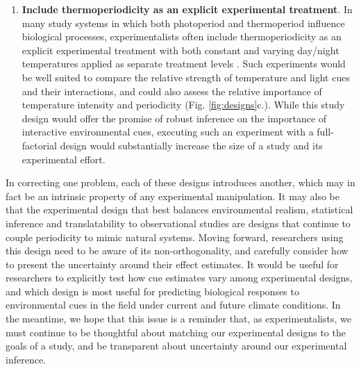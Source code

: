 \documentclass[11pt]{article}
\begin{document}
\begin{enumerate}
\item \textbf{Include thermoperiodicity as an explicit experimental treatment}. In many study systems in which both photoperiod and thermoperiod influence biological processes, experimentalists often include thermoperiodicity as an explicit experimental treatment with both constant and varying day/night temperatures applied as separate treatment levels \citep[e.g.,][]{Zaslavksi_1995}. Such experiments would be well suited to compare the relative strength of temperature and light cues and their interactions, and could also assess the relative importance of temperature intensity and periodicity (Fig. \ref{fig:designs}c.). While this study design would offer the promise of robust inference on the importance of interactive environmental cues, executing such an experiment with a full-factorial design would substantially increase the size of a study and its experimental effort. 
\end{enumerate}

In correcting one problem, each of these designs introduces another, which may in fact be an intrinsic property of any experimental manipulation. It may also be that the experimental design that best balances environmental realism, statistical inference and translatability to observational studies are designs that continue to couple periodicity to mimic natural systems. Moving forward, researchers using this design need to be aware of its non-orthogonality, and carefully consider how to present the uncertainty around their effect estimates. It would be useful for researchers to explicitly test how cue estimates vary among experimental designs, and which design is most useful for predicting biological responses to environmental cues in the field under current and future climate conditions. In the meantime, we hope that this issue is a reminder that, as experimentalists, we must continue to be thoughtful about matching our experimental designs to the goals of a study, and be transparent about uncertainty around our experimental inference.


\end{document}
